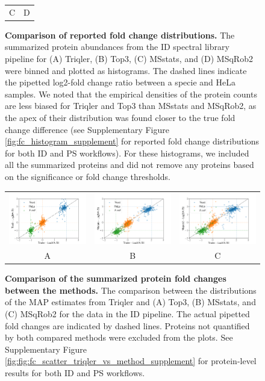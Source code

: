 \documentclass[10pt,letterpaper]{article}
\begin{document}
\begin{figure}[hbt]
\begin{tabular}{cc}
        C & D 
    \end{tabular}
    \caption{{\bf Comparison of reported fold change distributions.} The summarized protein abundances from the ID spectral library pipeline for (A) Triqler, (B) Top3, (C) MSstats, and (D) MSqRob2 were binned and plotted as histograms. The dashed lines indicate the pipetted log2-fold change ratio between a specie and HeLa samples. We noted that the empirical densities of the protein counts are less biased for Triqler and Top3 than MSstats and MSqRob2, as the apex of their distribution was found closer to the true fold change difference (see Supplementary Figure \ref{fig:fc_histogram_supplement} for reported fold change distributions for both ID and PS workflows). For these histograms, we included all the summarized proteins and did not remove any proteins based on  the significance or fold change thresholds. \label{fig:fc_histogram}}
\end{figure}


\begin{figure}[hbt]
    \centering
    \begin{tabular}{ccc}
        \includegraphics[width=0.33\linewidth]{./img/scatter_ID_triqler_vs_top3.png} & 
        \includegraphics[width=0.33\linewidth]{./img/scatter_ID_triqler_vs_msstats.png} & 
        \includegraphics[width=0.33\linewidth]{./img/scatter_ID_triqler_vs_msqrob2.png} \\
        A & B & C
    \end{tabular}
    \caption{{\bf Comparison of the summarized protein fold changes between the methods.} The comparison between the distributions of the MAP estimates from Triqler and (A) Top3, (B) MSstats, and (C) MSqRob2 for the data in the ID pipeline. The actual pipetted fold changes are indicated by dashed lines. Proteins not quantified by both compared methods were excluded from the plots. See Supplementary Figure \ref{fig:fig:fc_scatter_triqler_vs_method_supplement} for protein-level results for both ID and PS workflows. \label{fig:fc_scatter}}
\end{figure}
\end{document}
